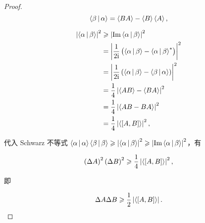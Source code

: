 \begin{proof}
\begin{equation}
\Braket{\beta | \alpha }
=\Braket{BA } - \Braket{B }\Braket{A },
\end{equation}

\begin{equation}
\begin{split}
\left|\Braket{\alpha | \beta } \right|^2
&\geqslant \left|\mathrm{Im}\Braket{\alpha | \beta } \right|^2 \\
&=\left|\frac{1 }{2\mathrm{i} } \left(\Braket{\alpha | \beta } - \Braket{\alpha | \beta }^* \right) \right|^2 \\
&=\left|\frac{1 }{2\mathrm{i} } \left(\Braket{\alpha | \beta } - \Braket{\beta | \alpha } \right) \right|^2 \\
&=\frac{1 }{4 } \left|\Braket{AB } - \Braket{BA } \right|^2 \\
&=\frac{1 }{4 } \left|\Braket{AB-BA } \right|^2 \\
&=\frac{1 }{4 } \left|\Braket{\left[A , B \right] } \right|^2,
\end{split}
\end{equation}

代入 Schwarz 不等式 $\Braket{\alpha | \alpha} \Braket{\beta | \beta} \geqslant \left|\Braket{\alpha | \beta} \right|^2\geqslant \left|\mathrm{Im}\Braket{\alpha | \beta } \right|^2 $，有

\begin{equation}
\left(\Delta A \right)^2 \left(\Delta B \right)^2
\geqslant \frac{1 }{4 } \left|\Braket{\left[A , B \right] } \right|^2,
\end{equation}

即

\begin{equation}
\Delta A \Delta B
\geqslant \frac{1 }{2 } \left|\Braket{\left[A , B \right]} \right|.
\end{equation}

\end{proof}